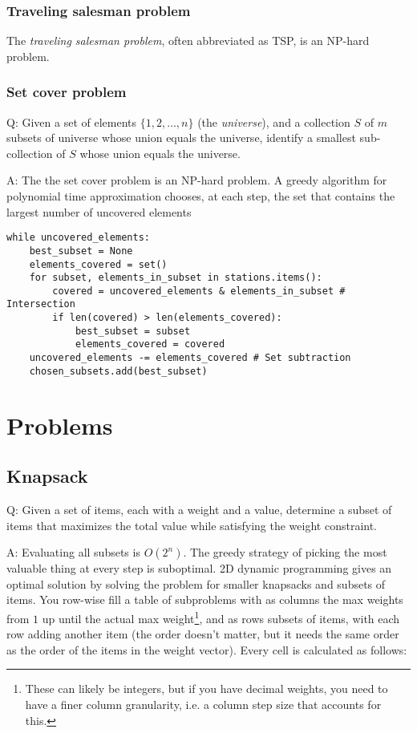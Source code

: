 \documentclass[8pt, table, xcdraw]{article}%
\begin{document}
\subsubsection{Traveling salesman problem}

The \emph{traveling salesman problem}, often abbreviated as TSP, is an NP-hard problem.

\subsubsection{Set cover problem}

Q: Given a set of elements $\{1, 2, …, n\}$ (the \emph{universe}), and a collection $S$ of $m$ subsets of universe whose union equals the universe, identify a smallest sub-collection of $S$ whose union equals the universe.

A: The the set cover problem is an NP-hard problem. A greedy algorithm for polynomial time approximation chooses, at each step, the set that contains the largest number of uncovered elements

\begin{lstlisting}
while uncovered_elements:
    best_subset = None
    elements_covered = set()
    for subset, elements_in_subset in stations.items():
        covered = uncovered_elements & elements_in_subset # Intersection
        if len(covered) > len(elements_covered):
            best_subset = subset
            elements_covered = covered
    uncovered_elements -= elements_covered # Set subtraction
    chosen_subsets.add(best_subset)
\end{lstlisting}

\section{Problems}

\subsection{Knapsack}

Q: Given a set of items, each with a weight and a value, determine a subset of items that maximizes the total value while satisfying the weight constraint.

A: Evaluating all subsets is $O(2^n)$. The greedy strategy of picking the most valuable thing at every step is suboptimal. 2D dynamic programming gives an optimal solution by solving the problem for smaller knapsacks and subsets of items. You row-wise fill a table of subproblems with as columns the max weights from $1$ up until the actual max weight\footnote{These can likely be integers, but if you have decimal weights, you need to have a finer column granularity, i.e. a column step size that accounts for this.}, and as rows subsets of items, with each row adding another item (the order doesn't matter, but it needs the same order as the order of the items in the weight vector). Every cell is calculated as follows:
\end{document}
